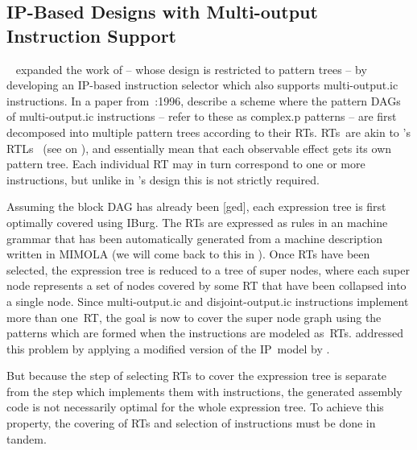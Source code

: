 \subsection{IP-Based Designs with Multi-output Instruction Support}

\citeauthor{LeupersMarwedel:1996}~\cite{LeupersMarwedel:1995,
  LeupersMarwedel:1996} expanded the work of \citeauthor{WilsonEtAl:1994} --
whose design is restricted to \glspl{pattern tree} -- by developing an
\gls{IP}-based \gls{instruction selector} which also supports
\gls{multi-output.ic} \glspl{instruction}.
%
In a paper from~:1996, \citeauthor{LeupersMarwedel:1996} describe a scheme where the
\glspl{pattern DAG} of \gls{multi-output.ic} \glspl{instruction} --
\citeauthor{LeupersMarwedel:1996} refer to these as \gls{complex.p} \glspl{pattern} --
are first decomposed into multiple \glspl{pattern tree} according to their
\glspl{RT}.
%
\glspl{RT}~are akin to \citeauthor{Fraser:1979}'s \glspl{RTL}~\cite{Fraser:1979}
(see  on
), and essentially mean that each
observable effect gets its own \gls{pattern tree}.
%
Each individual \gls{RT} may in turn correspond to one or more
\glspl{instruction}, but unlike in \citeauthor{Fraser:1979}'s design this is not
strictly required.

Assuming the \gls{block DAG} has already been [ged], each
\gls{expression tree} is first optimally covered using \gls{IBurg}.
%
The \glspl{RT} are expressed as \glspl{rule} in an \gls{machine grammar} that
has been automatically generated from a \gls{machine description} written in
\gls{MIMOLA} (we will come back to this in
).
%
Once \glspl{RT} have been selected, the \gls{expression tree} is reduced to a
\gls{tree} of \glspl{super node}, where each \gls{super node} represents a set
of \glspl{node} covered by some \gls{RT} that have been collapsed into a single
\gls{node}.
%
Since \gls{multi-output.ic} and \gls{disjoint-output.ic} \glspl{instruction}
implement more than one~\gls{RT}, the goal is now to cover the \gls{super node}
\gls{graph} using the \glspl{pattern} which are formed when the
\glspl{instruction} are modeled as~\glspl{RT}.
%
\citeauthor{LeupersMarwedel:1996} addressed this problem by applying a modified
version of the \gls{IP}~model by \citeauthor{WilsonEtAl:1994}.

But because the step of selecting \glspl{RT} to cover the \gls{expression tree}
is separate from the step which implements them with \glspl{instruction}, the
generated \gls{assembly code} is not necessarily optimal for the whole
\gls{expression tree}.
%
To achieve this property, the covering of \glspl{RT} and selection of
\glspl{instruction} must be done in tandem.



